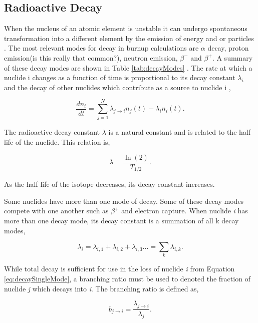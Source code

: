 \subsection{Radioactive Decay}
When the nucleus of an atomic element is unstable it can undergo spontaneous transformation into a different element by the emission of energy and or particles \cite{duderstadt1976}. The most relevant modes for decay in burnup calculations are $\alpha$ decay, proton emission(is this really that common?), neutron emission, $\beta^{-}$ and $\beta^{+}$. A summary of these decay modes are shown in Table \ref{tab:decayModes} \cite{pusaThesis}. The rate at which a nuclide i changes as a function of time is proportional to its decay constant $\lambda_{i}$ and the decay of other nuclides which contribute as a source to nuclide i  \cite{duderstadt1976}, 

\begin{equation}
    \frac{dn_{i}}{dt} = \sum_{j=1}^{N} \lambda_{j\rightarrow i}n_{j}(t) -\lambda_{i} n_{i}(t).
    \label{eq:decaySingleMode}
\end{equation}

\noindent The radioactive decay constant $\lambda$ is a natural constant and is related to the half life of the nuclide. This relation is,

\begin{equation}
    \lambda = \frac{\ln(2)}{T_{1/2}}.
\end{equation}

\noindent As the half life of the isotope decreases, its decay constant increases. 

Some nuclides have more than one mode of decay. Some of these decay modes compete with one another such as $\beta^{+}$ and electron capture. When nuclide \textit{i} has more than one decay mode, its decay constant is a summation of all k decay modes,

\begin{equation}
    \lambda_{i} = \lambda_{i,1} + \lambda_{i,2} + \lambda_{i,3} ... = \sum_{k} \lambda_{i,k}.
\end{equation}

\noindent While total decay is sufficient for use in the loss of nuclide \textit{i} from Equation \ref{eq:decaySingleMode}, a branching ratio must be used to denoted the fraction of nuclide \textit{j} which decays into \textit{i}. The branching ratio is defined as,

\begin{equation}
    b_{j\rightarrow i} = \frac{\lambda_{j\rightarrow i}}{\lambda_{j}}.
\end{equation}

